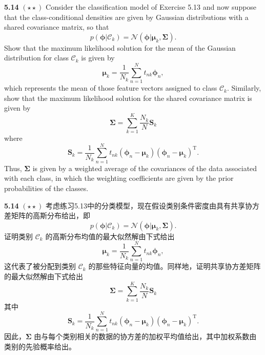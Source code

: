 \documentclass{article}
\begin{document}
\textbf{5.14} $(\star\star)$ Consider the classification model of Exercise 5.13 and now suppose that the class-conditional densities are given by Gaussian distributions with a shared covariance matrix, so that
\begin{equation}
p(\boldsymbol{\phi}|\mathcal{C}_k) = \mathcal{N}(\boldsymbol{\phi}|\boldsymbol{\mu}_k, \boldsymbol{\Sigma}). \tag{5.102}
\end{equation}
Show that the maximum likelihood solution for the mean of the Gaussian distribution for class $\mathcal{C}_k$ is given by
\begin{equation}
\boldsymbol{\mu}_k = \frac{1}{N_k} \sum_{n=1}^{N} t_{nk} \boldsymbol{\phi}_n, \tag{5.103}
\end{equation}
which represents the mean of those feature vectors assigned to class $\mathcal{C}_k$. Similarly, show that the maximum likelihood solution for the shared covariance matrix is given by
\begin{equation}
\boldsymbol{\Sigma} = \sum_{k=1}^{K} \frac{N_k}{N} \mathbf{S}_k \tag{5.104}
\end{equation}
where
\begin{equation}
\mathbf{S}_k = \frac{1}{N_k} \sum_{n=1}^{N} t_{nk} (\boldsymbol{\phi}_n - \boldsymbol{\mu}_k)(\boldsymbol{\phi}_n - \boldsymbol{\mu}_k)^{\mathrm{T}}. \tag{5.105}
\end{equation}
Thus, $\boldsymbol{\Sigma}$ is given by a weighted average of the covariances of the data associated with each class, in which the weighting coefficients are given by the prior probabilities of the classes.

\textbf{5.14} $(\star\star)$ 考虑练习5.13中的分类模型，现在假设类别条件密度由具有共享协方差矩阵的高斯分布给出，即
\begin{equation}
p(\boldsymbol{\phi}|\mathcal{C}_k) = \mathcal{N}(\boldsymbol{\phi}|\boldsymbol{\mu}_k, \boldsymbol{\Sigma}). \tag{5.102}
\end{equation}
证明类别 $\mathcal{C}_k$ 的高斯分布均值的最大似然解由下式给出
\begin{equation}
\boldsymbol{\mu}_k = \frac{1}{N_k} \sum_{n=1}^{N} t_{nk} \boldsymbol{\phi}_n, \tag{5.103}
\end{equation}
这代表了被分配到类别 $\mathcal{C}_k$ 的那些特征向量的均值。同样地，证明共享协方差矩阵的最大似然解由下式给出
\begin{equation}
\boldsymbol{\Sigma} = \sum_{k=1}^{K} \frac{N_k}{N} \mathbf{S}_k \tag{5.104}
\end{equation}
其中
\begin{equation}
\mathbf{S}_k = \frac{1}{N_k} \sum_{n=1}^{N} t_{nk} (\boldsymbol{\phi}_n - \boldsymbol{\mu}_k)(\boldsymbol{\phi}_n - \boldsymbol{\mu}_k)^{\mathrm{T}}. \tag{5.105}
\end{equation}
因此，$\boldsymbol{\Sigma}$ 由与每个类别相关的数据的协方差的加权平均值给出，其中加权系数由类别的先验概率给出。
\end{document}
